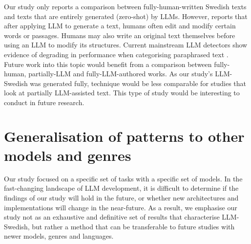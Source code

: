 \documentclass[thesis]{cluu}
\begin{document}
Our study only reports a comparison between fully-human-written Swedish texts and texts that are entirely generated (zero-shot) by LLMs. However, \textcite{wu2024detectrl} reports that after applying LLM to generate a text, humans often edit and modify certain words or passages. Humans may also write an original text themselves before using an LLM to modify its structures. Current mainstream LLM detectors show evidence of degrading in performance when categorising paraphrased text \parencite{wolff2020attacking}. Future work into this topic would benefit from a comparison between fully-human, partially-LLM and fully-LLM-authored works. As our study's LLM-Swedish was generated fully, technique would be less comparable for studies that look at partially LLM-assisted text. This type of study would be interesting to conduct in future research.

\section{Generalisation of patterns to other models and genres}

Our study focused on a specific set of tasks with a specific set of models. In the fast-changing landscape of LLM development, it is difficult to determine if the findings of our study will hold in the future, or whether new architectures and implementations will change in the near-future. As a result, we emphasise our study not as an exhaustive and definitive set of results that characterise LLM-Swedish, but rather a method that can be transferable to future studies with newer models, genres and languages.
\end{document}
